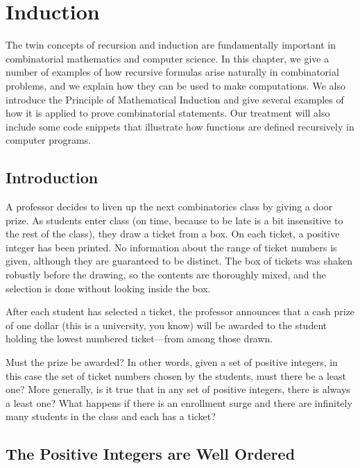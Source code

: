 
\chapter{Induction}\label{ch:induction}
The twin concepts of recursion and induction are fundamentally
important in combinatorial mathematics and computer science.  In this
chapter, we give a number of examples of how recursive formulas arise
naturally in combinatorial problems, and we explain how they can be
used to make computations.  We also introduce the Principle of
Mathematical Induction and give several examples of how it is applied
to prove combinatorial statements.  Our treatment will also include
some code snippets that illustrate how functions are defined
recursively in computer programs.


\section{Introduction}\label{s:induction:intro}
A professor decides to liven up the next combinatorics class by
giving a door prize.  As students enter class (on time, because to be
late is a bit insensitive to the rest of the class), they draw a
ticket from a box.  On each ticket, a positive integer has been
printed.  No information about the range of ticket numbers is given,
although they are guaranteed to be distinct. The box of tickets was
shaken robustly before the drawing, so the contents are thoroughly mixed, 
and the selection is done without looking inside the box.

After each student has selected a ticket, the professor announces that
a cash prize of one dollar (this is a university, you know) will be
awarded to the student holding the lowest numbered ticket---from among
those drawn.

Must the prize be awarded?  In other words, given a set of positive
integers, in this case the set of ticket numbers chosen by the
students, must there be a least one?  More generally, is it true that
in any set of positive integers, there is always a least one?  What
happens if there is an enrollment surge and there are infinitely many
students in the class and each has a ticket?

\section{The Positive Integers are Well Ordered}\label{s:induction:posintsord}

